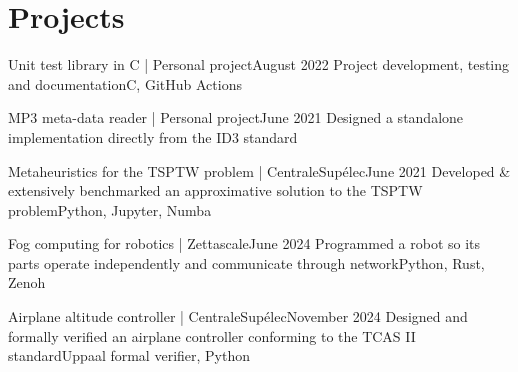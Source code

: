 \section{Projects}
\resumeSubHeadingListStart
    \resumeProjectHeading
    {Unit test library in C | Personal project}{\quad August 2022}
    {Project development, testing and documentation}{C, GitHub Actions}
    {}

    \resumeProjectHeading
    {MP3 meta-data reader | Personal project}{June 2021}
    {Designed a standalone implementation directly from the ID3 standard}{}
    {}

    \resumeProjectHeading
    {Metaheuristics for the TSPTW problem | CentraleSupélec}{June 2021}
    {Developed \& extensively benchmarked an approximative solution to the TSPTW problem}{Python, Jupyter, Numba}
    {}

    \resumeProjectHeading
    {Fog computing for robotics | Zettascale}{June 2024}
    {Programmed a robot so its parts operate independently and communicate through network}{Python, Rust, Zenoh}
    {}

    \resumeProjectHeading
    {Airplane altitude controller | CentraleSupélec}{November 2024}
    {Designed and formally verified an airplane controller conforming to the TCAS II standard}{Uppaal formal verifier, Python}
    {}

\resumeSubHeadingListEnd
